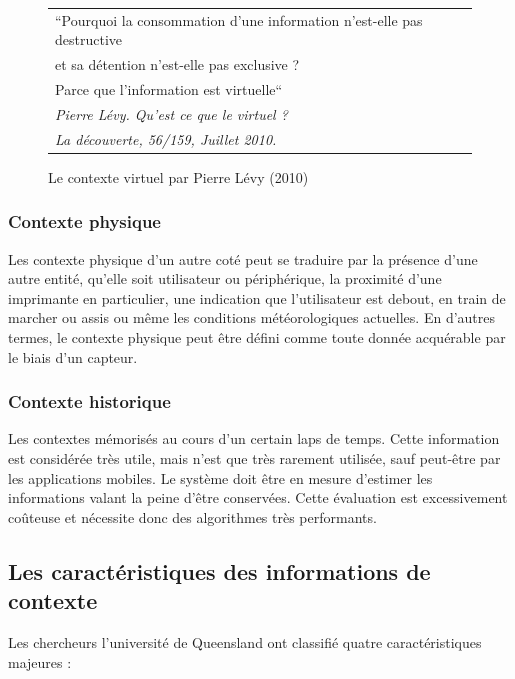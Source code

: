 \begin{figure}[H]
    \centering
    \begin{tabular}{l}
        ``Pourquoi la consommation d'une information n'est-elle pas destructive
        \\ et sa détention n'est-elle pas exclusive ? \\ 
        Parce que l'information est virtuelle``
        \cite{levy_quest_2010} \\
        \em \footnotesize Pierre Lévy. Qu'est ce que le virtuel ?\\
        \em \footnotesize La découverte, 56/159, Juillet 2010. \\
    \end{tabular}
    \caption{Le contexte virtuel par Pierre Lévy (2010)}
    \label{fig:quote}
\end{figure}

\subsubsection{Contexte physique}

Les contexte physique d'un autre coté peut se traduire par la présence d'une
autre entité, qu'elle soit utilisateur ou périphérique, la proximité d'une
imprimante en particulier, une indication que l'utilisateur est debout, en train
de marcher ou assis ou même les conditions météorologiques actuelles. En d'autres
termes, le contexte physique peut être défini comme toute donnée acquérable par
le biais d'un capteur.

\subsubsection{Contexte historique}

Les contextes mémorisés au cours d'un certain laps de temps. Cette information
est considérée très utile, mais n'est que très rarement utilisée, sauf peut-être
par les applications mobiles. Le système doit être en mesure d'estimer les
informations valant la peine d'être conservées. Cette évaluation est
excessivement coûteuse et nécessite donc des algorithmes très performants.

\subsection{Les caractéristiques des informations de contexte}

Les chercheurs l'université de Queensland ont classifié quatre caractéristiques
majeures : \cite{catharina_context_2002}

